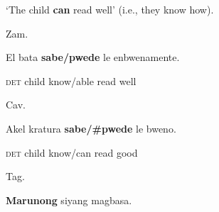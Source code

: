 \setcounter{listWWNumiileveli}{0}
\begin{listWWNumiileveli}
\item 
\begin{stylelsLanginfo}
‘The child \textbf{can} read well’ (i.e., they know how).
\end{stylelsLanginfo}


\setcounter{listWWNumiilevelii}{0}
\begin{listWWNumiilevelii}
\item 
\begin{stylelsLanginfo}
Zam.
\end{stylelsLanginfo}
\end{listWWNumiilevelii}
\end{listWWNumiileveli}
\begin{stylelsSourceline}
El bata \textbf{sabe/pwede} le enbwenamente.
\end{stylelsSourceline}

\begin{stylelsIMT}
\textsc{det} child know/able read well
\end{stylelsIMT}

\begin{listWWNumiileveli}
\item 
\begin{listWWNumiilevelii}
\item 
\begin{stylelsLanginfo}
Cav.
\end{stylelsLanginfo}
\end{listWWNumiilevelii}
\end{listWWNumiileveli}
\begin{stylelsSourceline}
Akel kratura \textbf{sabe/\#pwede} le bweno.
\end{stylelsSourceline}

\begin{stylelsIMT}
\textsc{det} child know/can read good
\end{stylelsIMT}

\begin{listWWNumiileveli}
\item 
\begin{listWWNumiilevelii}
\item 
\begin{stylelsLanginfo}
Tag.
\end{stylelsLanginfo}
\end{listWWNumiilevelii}
\end{listWWNumiileveli}
\begin{stylelsSourceline}
\textbf{Marunong} siyang magbasa.
\end{stylelsSourceline}


